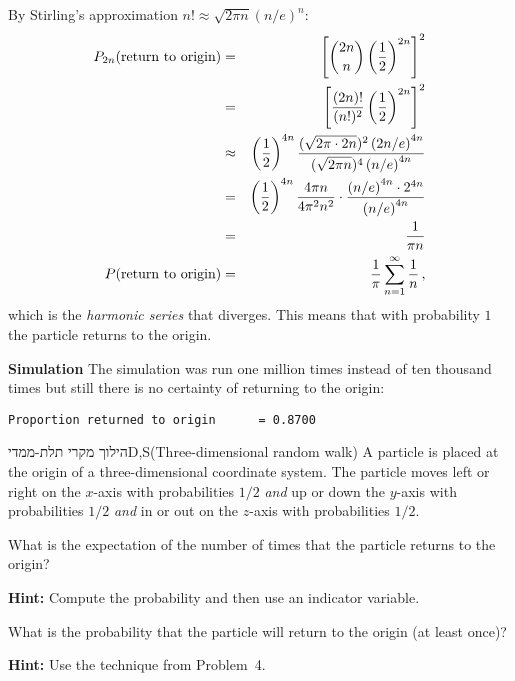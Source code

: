 By Stirling's approximation $n! \approx \sqrt{2\pi n}\left(n/e\right)^n$:
\begin{eqnarray*}
P_{2n}(\textrm{return to origin}) &=&
\left[\displaystyle{2n \choose n}
\left(\displaystyle\frac{1}{2}\right)^{2n}\right]^2 \\
&=&
\left[\displaystyle\frac{(2n)!}{(n!)^2}
\left(\displaystyle\frac{1}{2}\right)^{2n}\right]^2 \\
&\approx&
\left(\displaystyle\frac{1}{2}\right)^{4n}
\displaystyle\frac{(\sqrt{2\pi \cdot 2n})^2
         \left(2n/e\right)^{4n}}{(\sqrt{2\pi n})^{4}
         \left(n/e\right)^{4n}} \\
&=&\left(\displaystyle\frac{1}{2}\right)^{4n}\displaystyle\frac{4\pi n}{4\pi^2 n^2}\cdot
\displaystyle\frac{\left(n/e\right)^{4n}\cdot 2^{4n}}{\left(n/e\right)^{4n}}\\
&=& \displaystyle\frac{1}{\pi n}\\
P(\textrm{return to origin}) &=& \displaystyle\frac{1}{\pi}\sum_{n=1}^{\infty}\displaystyle\frac{1}{n}\,,
\end{eqnarray*}
which is the \emph{harmonic series} that diverges. This means that with probability $1$ the particle returns to the origin.

\textbf{Simulation}
The simulation was run one million times instead of ten thousand times but still there is no certainty of returning to the origin:
\begin{verbatim}
Proportion returned to origin      = 0.8700
\end{verbatim}


\begin{prob}{הילוך מקרי תלת-ממדי}{D,S}{(Three-dimensional random walk)}
A particle is placed at the origin of a three-dimensional coordinate system. The particle moves left or right on the $x$-axis with probabilities $1/2$ \emph{and} up or down the $y$-axis with probabilities $1/2$ \emph{and} in or out on the $z$-axis with probabilities $1/2$.

 What is the expectation of the number of times that the particle returns to the origin?

\textbf{Hint:} Compute the probability and then use an indicator variable.

 What is the probability that the particle will return to the origin (at least once)?

\textbf{Hint:} Use the technique from Problem~4.
\end{prob}

\solution{}

